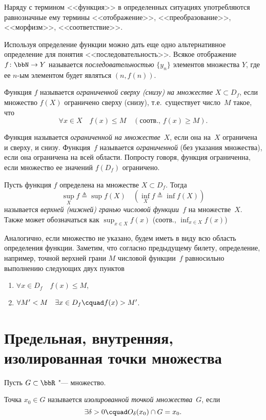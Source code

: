 Наряду с термином <<функция>> в определенных ситуациях употребляются равнозначные ему термины <<отображение>>, <<преобразование>>, <<морфизм>>, <<соответствие>>.
\begin{notion}
Используя определение функции можно дать еще одно альтернативное определение для понятия <<последовательность>>. Всякое отображение $f\colon \bbN \to Y$  называется \textit{последовательностью} $\{y_n\}$ элементов множества $Y$, где ее $n$-ым элементом будет являться $(n, f(n))$.
\end{notion} 

\begin{defn}
Функция $f$ называется \textit{ограниченной сверху (снизу) на множестве} $X\subset D_f$, если множество $f(X)$ ограничено сверху (снизу), т.е.~существует число~$M$ такое, что
$$
\forall x \in X \quad f(x) \le M \quad (\text{соотв., }f(x)\ge M).
$$
\end{defn}

Функция называется \textit{ограниченной на множестве}~$X$, если она на~$X$ ограничена и сверху, и снизу. Функция~$f$ называется \textit{ограниченной} (без указания множества), если она ограничена на всей области. Попросту говоря, функция ограниченна, если множество ее значений $f(D_f)$ ограничено.

\begin{defn}
Пусть функция $f$ определена на множестве $X\subset D_f$. Тогда 
$$
\sup_{X}\limits f \triangleq \sup f(X)\quad (\inf_{X}\limits f \triangleq \inf f(X))
$$ называется \textit{верхней (нижней) гранью числовой функции~$f$} на множестве~$X$. Также может обозначаться как $\sup_{x\in X}\limits f(x)$ (соотв., $\inf_{x\in X}\limits f(x)$)
\end{defn}

Аналогично, если множество не указано, будем иметь в виду всю область определения функции. Заметим, что согласно предыдущему билету, определение, например, точной верхней грани $M$ числовой функции~$f$ равносильно выполнению следующих двух пунктов 
\begin{enumerate}
\item
$\forall x \in D_f\quad f(x) \le M$,
\item
$\forall M' < M \quad \exists x\in D_f\cquad f(x) > M'$.
\end{enumerate}

\section{Предельная, внутренняя, изолированная точки множества}
Пусть $G \subset \bbR$ "--- множество.
\begin{defn}
Точка $x_0 \in G$ называется \textit{изолированной точкой множества}~$G$, если $$\exists \delta >0\cquad  O_\delta(x_0) \cap G = x_0.$$
\end{defn}

